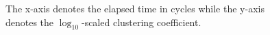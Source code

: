 \begin{figure}
  \centering
  \hspace{10pt}
  \caption{\label{fig:clustering}The x-axis denotes the elapsed time in cycles
    while the y-axis denotes the $\log_{10}$-scaled clustering coefficient.}
\end{figure}


